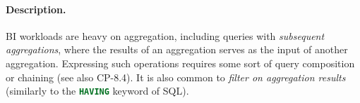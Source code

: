 
\paragraph{Description.}

BI workloads are heavy on aggregation, including queries with \emph{subsequent
aggregations}, where the results of an aggregation serves as the input of
another aggregation. Expressing such operations requires some sort of query
composition or chaining (see also CP-8.4). It is also common to \emph{filter on
aggregation results} (similarly to the \lstinline[language=sql]{HAVING} keyword
of SQL).


